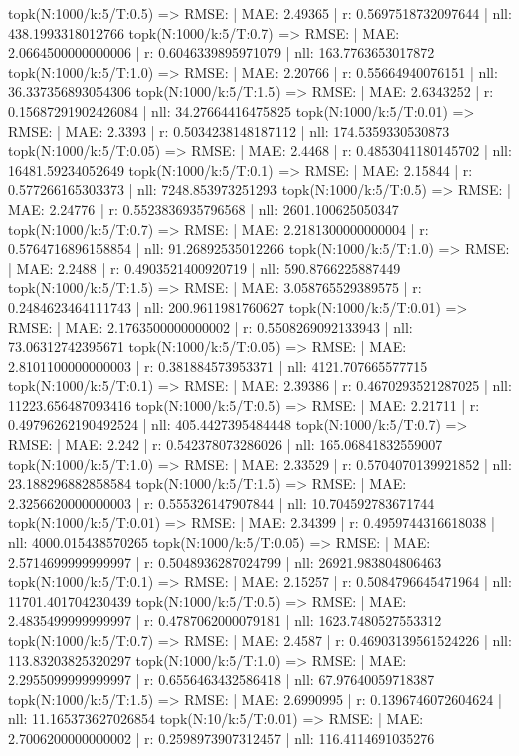 topk(N:1000/k:5/T:0.5) => RMSE: | MAE: 2.49365 | r: 0.5697518732097644 | nll: 438.1993318012766
topk(N:1000/k:5/T:0.7) => RMSE: | MAE: 2.0664500000000006 | r: 0.6046339895971079 | nll: 163.7763653017872
topk(N:1000/k:5/T:1.0) => RMSE: | MAE: 2.20766 | r: 0.55664940076151 | nll: 36.337356893054306
topk(N:1000/k:5/T:1.5) => RMSE: | MAE: 2.6343252 | r: 0.15687291902426084 | nll: 34.27664416475825
topk(N:1000/k:5/T:0.01) => RMSE: | MAE: 2.3393 | r: 0.5034238148187112 | nll: 174.5359330530873
topk(N:1000/k:5/T:0.05) => RMSE: | MAE: 2.4468 | r: 0.4853041180145702 | nll: 16481.59234052649
topk(N:1000/k:5/T:0.1) => RMSE: | MAE: 2.15844 | r: 0.577266165303373 | nll: 7248.853973251293
topk(N:1000/k:5/T:0.5) => RMSE: | MAE: 2.24776 | r: 0.5523836935796568 | nll: 2601.100625050347
topk(N:1000/k:5/T:0.7) => RMSE: | MAE: 2.2181300000000004 | r: 0.5764716896158854 | nll: 91.26892535012266
topk(N:1000/k:5/T:1.0) => RMSE: | MAE: 2.2488 | r: 0.4903521400920719 | nll: 590.8766225887449
topk(N:1000/k:5/T:1.5) => RMSE: | MAE: 3.058765529389575 | r: 0.2484623464111743 | nll: 200.9611981760627
topk(N:1000/k:5/T:0.01) => RMSE: | MAE: 2.1763500000000002 | r: 0.5508269092133943 | nll: 73.06312742395671
topk(N:1000/k:5/T:0.05) => RMSE: | MAE: 2.8101100000000003 | r: 0.381884573953371 | nll: 4121.707665577715
topk(N:1000/k:5/T:0.1) => RMSE: | MAE: 2.39386 | r: 0.4670293521287025 | nll: 11223.656487093416
topk(N:1000/k:5/T:0.5) => RMSE: | MAE: 2.21711 | r: 0.49796262190492524 | nll: 405.4427395484448
topk(N:1000/k:5/T:0.7) => RMSE: | MAE: 2.242 | r: 0.542378073286026 | nll: 165.06841832559007
topk(N:1000/k:5/T:1.0) => RMSE: | MAE: 2.33529 | r: 0.5704070139921852 | nll: 23.188296882858584
topk(N:1000/k:5/T:1.5) => RMSE: | MAE: 2.3256620000000003 | r: 0.555326147907844 | nll: 10.704592783671744
topk(N:1000/k:5/T:0.01) => RMSE: | MAE: 2.34399 | r: 0.4959744316618038 | nll: 4000.015438570265
topk(N:1000/k:5/T:0.05) => RMSE: | MAE: 2.5714699999999997 | r: 0.5048936287024799 | nll: 26921.983804806463
topk(N:1000/k:5/T:0.1) => RMSE: | MAE: 2.15257 | r: 0.5084796645471964 | nll: 11701.401704230439
topk(N:1000/k:5/T:0.5) => RMSE: | MAE: 2.4835499999999997 | r: 0.4787062000079181 | nll: 1623.7480527553312
topk(N:1000/k:5/T:0.7) => RMSE: | MAE: 2.4587 | r: 0.46903139561524226 | nll: 113.83203825320297
topk(N:1000/k:5/T:1.0) => RMSE: | MAE: 2.2955099999999997 | r: 0.6556463432586418 | nll: 67.97640059718387
topk(N:1000/k:5/T:1.5) => RMSE: | MAE: 2.6990995 | r: 0.1396746072604624 | nll: 11.165373627026854
topk(N:10/k:5/T:0.01) => RMSE: | MAE: 2.7006200000000002 | r: 0.2598973907312457 | nll: 116.4114691035276
